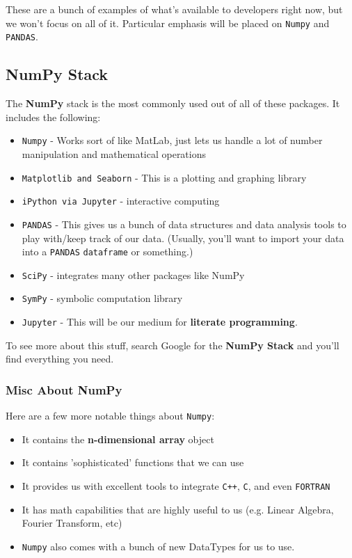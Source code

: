\documentclass[english, 10pt]{article}
\begin{document}
These are a bunch of examples of what's available to developers right now, but we won't focus on all of it. Particular emphasis will be placed on \texttt{Numpy} and \texttt{PANDAS}.

\subsection{NumPy Stack}

The \textbf{NumPy} stack is the most commonly used out of all of these packages. It includes the following:

\begin{itemize}
	\item \texttt{Numpy} - Works sort of like MatLab, just lets us handle a lot of number manipulation and mathematical operations
	\item \texttt{Matplotlib and Seaborn} - This is a plotting and graphing library
	\item \texttt{iPython via Jupyter} - interactive computing
	\item \texttt{PANDAS} - This gives us a bunch of data structures and data analysis tools to play with/keep track of our data. (Usually, you'll want to import your data into a \texttt{PANDAS} \texttt{dataframe} or something.)
	\item \texttt{SciPy} - integrates many other packages like NumPy
	\item \texttt{SymPy} - symbolic computation library
	\item \texttt{Jupyter} - This will be our medium for \textbf{literate programming}.
\end{itemize}

To see more about this stuff, search Google for the \textbf{NumPy Stack} and you'll find everything you need.

\subsubsection{Misc About NumPy}

Here are a few more notable things about \texttt{Numpy}:

\begin{itemize}
	\item It contains the \textbf{n-dimensional array} object
	\item It contains 'sophisticated' functions that we can use
	\item It provides us with excellent tools to integrate \texttt{C++}, \texttt{C}, and even \texttt{FORTRAN}
	\item It has math capabilities that are highly useful to us (e.g. Linear Algebra, Fourier Transform, etc)
	\item \texttt{Numpy} also comes with a bunch of new DataTypes for us to use.
\end{itemize}
\end{document}
